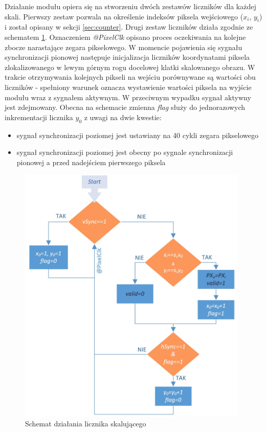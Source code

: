 Działanie modułu opiera się na stworzeniu dwóch zestawów liczników dla każdej skali. 
Pierwszy zestaw pozwala na określenie indeksów piksela wejściowego ($x_i$, $y_i$) i został opisany w sekcji \ref{sec:counter}. %
Drugi zestaw liczników działa zgodnie ze schematem \ref{fig:scaling_sch}. %
Oznaczeniem \textit{@PixelClk} opisano proces oczekiwania na kolejne zbocze narastające zegara pikselowego. W momencie pojawienia się sygnału synchronizacji pionowej następuje inicjalizacja liczników koordynatami piksela zlokalizowanego w lewym górnym rogu docelowej klatki skalowanego obrazu. W trakcie otrzymywania kolejnych pikseli na wejściu porównywane są wartości obu liczników - spełniony warunek oznacza wystawienie wartości piksela na wyjście modułu wraz z sygnałem aktywnym. W przeciwnym wypadku sygnał aktywny jest zdejmowany. Obecna na schemacie zmienna \textit{flag} służy do jednorazowych inkrementacji licznika $y_0$ z uwagi na dwie kwestie:
\begin{itemize}
	\item sygnał synchronizacji poziomej jest ustawiany na 40 cykli zegara pikselowego
	\item sygnał synchronizacji poziomej jest obecny po sygnale synchronizacji pionowej a przed nadejściem pierwszego piksela
\end{itemize}   
\begin{figure}[!h]
	\centering
	\includegraphics[width=11cm]{4_scaling.jpg}
	\caption{Schemat działania licznika skalującego}
	\label{fig:scaling_sch}
\end{figure}

